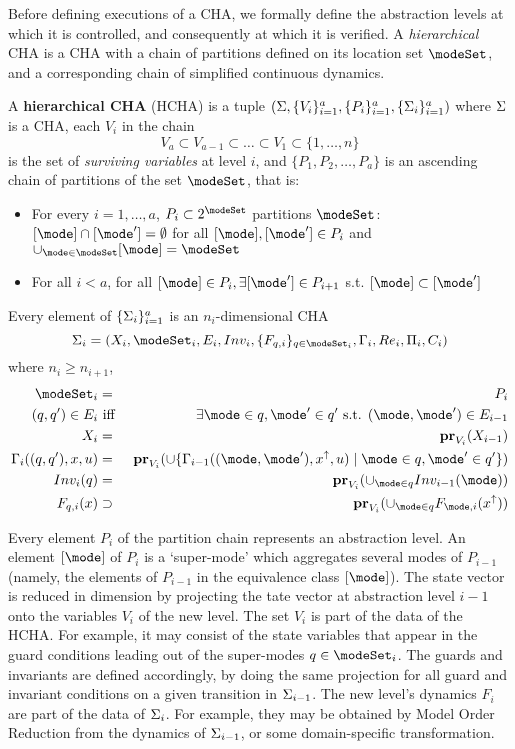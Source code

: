 
Before defining executions of a CHA, we formally define the abstraction levels at which it is controlled, and consequently at which it is verified.
A \emph{hierarchical} CHA is a CHA with a chain of partitions defined on its location set $\modeSet$, and a corresponding chain of simplified continuous dynamics.
\begin{defn}
	A \textbf{hierarchical CHA} (HCHA) is a tuple 
	$(\Sigma, \{V_i\}_{i=1}^{a}, \{P_i\}_{i=1}^{a}, \{\Sigma_i\}_{i=1}^{a})$ where 
	$\Sigma$ is a CHA, 
	each $V_i$ in the chain 
	\[V_a \subset V_{a-1} \subset \ldots \subset V_1 \subset \{1,\ldots,n\}\]
	is the set of \emph{surviving variables} at level $i$, and 
	$\{P_1,P_2,\ldots,P_a\}$ is an ascending chain of partitions of the set $\modeSet$, that is:
	\begin{itemize}
		\item For every $i =1,\ldots,a$, $P_i \subset 2^\modeSet$ partitions $\modeSet$: $[\mode] \cap [\mode'] = \emptyset$ for all $[\mode],[\mode'] \in P_i$ and $\cup_{\mode\in \modeSet}[\mode] = \modeSet$
		\item For all $i<a$, for all $[\mode]\in P_i, \exists [\mode'] \in P_{i+1}$ s.t. $[\mode] \subset [\mode']$ 
	\end{itemize}
	Every element of $\{\Sigma_i\}_{i=1}^{a}$ is an $n_i$-dimensional CHA 
	\[\Sys_i = (\stSet_i, \modeSet_i, E_i, Inv_i, \{F_{q,i}\}_{q \in \modeSet_i}, \guard_i, \reset_i, \funcOut_i, C_i)\]
	where  $n_i \geq n_{i+1}$,
	\begin{eqnarray*}
		\modeSet_i &=& P_i
		\\
		(q,q') \in E_i &\text{ iff }& \exists \mode \in q, \mode' \in q' \text{ s.t. } (\mode,\mode') \in E_{i-1}		
		\\
		\stSet_i & = & \proj{\stSet_{i-1}}{V_i} 
		\\
		\guard_i((q,q'),x,u) &=& \proj{\cup \{\guard_{i-1}((\mode,\mode'),x^\uparrow,u) \sut \mode \in q, \mode' \in q'\}}{V_i}
		\\
		Inv_i(q) &=& \proj{ \cup_{\mode \in q}Inv_{i-1}(\mode)}{V_i}
		\\
		F_{q,i}(x) &\supset & \proj{\cup_{\mode \in q}F_{\mode,i}(x^\uparrow)}{V_i}
	\end{eqnarray*}
	
\end{defn}

Every element $P_i$ of the partition chain represents an abstraction level. 
An element $[\mode]$ of $P_i$ is a `super-mode' which aggregates several modes of $P_{i-1}$ (namely, the elements of $P_{i-1}$ in the equivalence class $[\mode]$).
The state vector is reduced in dimension by projecting the tate vector at abstraction level $i-1$ onto the variables $V_i$ of the new level. 
The set $V_i$ is part of the data of the HCHA.
For example, it may consist of the state variables that appear in the guard conditions leading out of the super-modes $q \in \modeSet_i$.
The guards and invariants are defined accordingly, by doing the same projection for all guard and invariant conditions on a given transition in $\Sigma_{i-1}$.
The new level's dynamics $F_i$ are part of the data of $\Sigma_i$. 
For example, they may be obtained by Model Order Reduction from the dynamics of $\Sigma_{i-1}$, or some domain-specific transformation.


